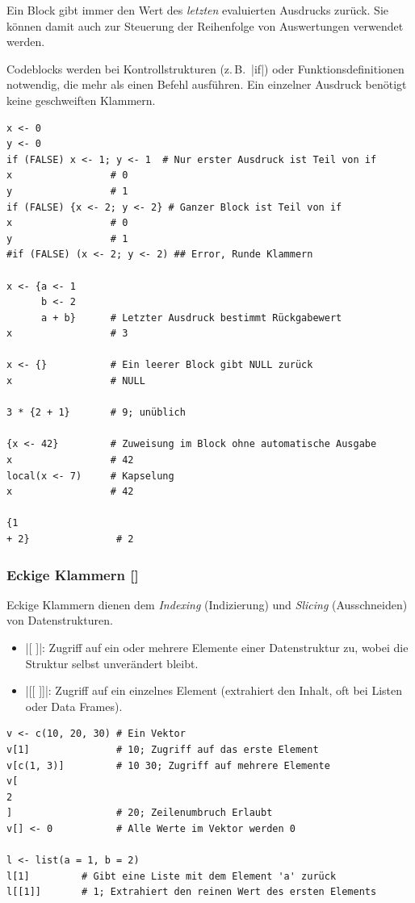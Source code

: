 \documentclass[10pt,twocolumn]{scrartcl}
\renewcommand{\lstinline}{\mycoloredinline}
\begin{document}
Ein Block gibt immer den Wert des \emph{letzten} evaluierten Ausdrucks zurück.  Sie können damit auch zur Steuerung der Reihenfolge von Auswertungen verwendet werden.

Codeblocks werden bei Kontrollstrukturen (z.\,B.\ \lstinline|if|) oder Funktionsdefinitionen notwendig, die mehr als einen Befehl ausführen. Ein einzelner Ausdruck benötigt keine geschweiften Klammern.

\begin{lstlisting}
x <- 0
y <- 0
if (FALSE) x <- 1; y <- 1  # Nur erster Ausdruck ist Teil von if
x                 # 0
y                 # 1
if (FALSE) {x <- 2; y <- 2} # Ganzer Block ist Teil von if
x                 # 0
y                 # 1
#if (FALSE) (x <- 2; y <- 2) ## Error, Runde Klammern

x <- {a <- 1
      b <- 2
      a + b}      # Letzter Ausdruck bestimmt Rückgabewert
x                 # 3

x <- {}           # Ein leerer Block gibt NULL zurück
x                 # NULL

3 * {2 + 1}       # 9; unüblich

{x <- 42}         # Zuweisung im Block ohne automatische Ausgabe
x                 # 42
local(x <- 7)     # Kapselung
x                 # 42

{1
+ 2}               # 2
\end{lstlisting}

\subsubsection{Eckige Klammern []}

Eckige Klammern dienen dem \emph{Indexing} (Indizierung) und \emph{Slicing} (Ausschneiden) von Datenstrukturen.

\begin{itemize}
\item \lstinline|[ ]|: Zugriff auf ein oder mehrere Elemente einer Datenstruktur zu, wobei die Struktur selbst unverändert bleibt.
\item \lstinline|[[ ]]|: Zugriff auf ein einzelnes Element (extrahiert den Inhalt, oft bei Listen oder Data Frames).
\end{itemize}

\begin{lstlisting}
v <- c(10, 20, 30) # Ein Vektor
v[1]               # 10; Zugriff auf das erste Element
v[c(1, 3)]         # 10 30; Zugriff auf mehrere Elemente
v[
2
]                  # 20; Zeilenumbruch Erlaubt
v[] <- 0           # Alle Werte im Vektor werden 0

l <- list(a = 1, b = 2)
l[1]         # Gibt eine Liste mit dem Element 'a' zurück
l[[1]]       # 1; Extrahiert den reinen Wert des ersten Elements
\end{lstlisting}
\end{document}
